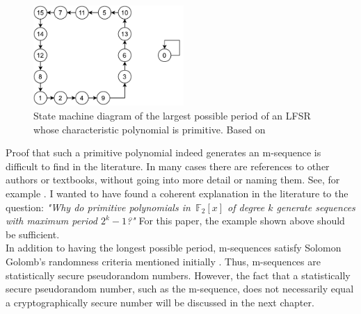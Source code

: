 \begin{figure}[h]
	\centering
	\includegraphics[width=0.51\textwidth]{carl/figures/figure_8_new_svg-raw.pdf}
	\caption{State machine diagram of the largest possible period of an LFSR whose characteristic polynomial is primitive. Based on  \cite[pp. 230-232]{Smart.2016}}
	\label{fig:Figure_8}
\end{figure}

Proof that such a primitive polynomial indeed generates an m-sequence is difficult to find in the literature. In many cases there are references to other authors or textbooks, without going into more detail or naming them. See, for example \cite[p. 229]{Smart.2016}. I wanted to have found a coherent explanation in the literature to the question: \textit{"Why do primitive polynomials in $\,\mathbb{F}_2[x]$ of degree $k$ generate sequences with maximum period $2^{k}-1$?"} For this paper, the example shown above should be sufficient. \\

In addition to having the longest possible period, m-sequences satisfy Solomon Golomb's randomness criteria mentioned initially \cite[p. 2847]{Gong.2018}. Thus, m-sequences are statistically secure pseudorandom numbers. However, the fact that a statistically secure pseudorandom number, such as the m-sequence, does not necessarily equal a cryptographically secure number will be discussed in the next chapter.

\pagebreak
